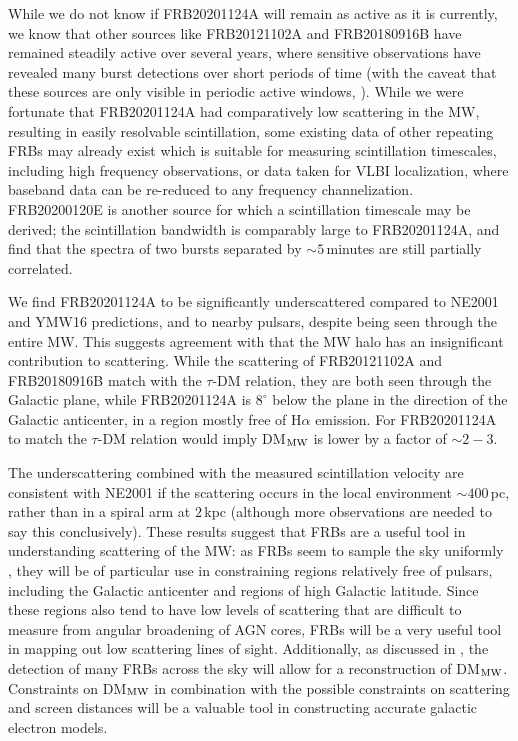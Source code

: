 \documentclass[fleqn,usenatbib]{mnras}
\newcommand{\frb}{FRB20201124A}
\newcommand{\rGC}{FRB20200120E}
\newcommand{\rthree}{FRB20180916B}
\newcommand{\rone}{FRB20121102A}
\begin{document}
While we do not know if {\frb} will remain as active as it is currently, we know that other sources like {\rone} and {\rthree} have remained steadily active over several years, where sensitive observations have revealed many burst detections over short periods of time (with the caveat that these sources are only visible in periodic active windows, \citealt{chime20_periodicity, rajwade+20}).  While we were fortunate that {\frb} had comparatively low scattering in the MW, resulting in easily resolvable scintillation, some existing data of other repeating FRBs may already exist which is suitable for measuring scintillation timescales, including high frequency observations, or data taken for VLBI localization, where baseband data can be re-reduced to any frequency channelization.  {\rGC} is another source for which a scintillation timescale may be derived; the scintillation bandwidth is comparably large to {\frb}, and \citet{nimmo+21b} find that the spectra of two bursts separated by $\sim 5$\,minutes are still partially correlated.

We find {\frb} to be significantly underscattered compared to NE2001 and YMW16 predictions, 
and to nearby pulsars, despite being seen through the entire MW.  This suggests 
agreement with \citet{ocker+21} that the MW halo has an insignificant contribution 
to scattering.  While the scattering of {\rone} and {\rthree} match with the $\tau$-DM 
relation, they are both seen through the Galactic plane, while {\frb} is $8^{\circ}$ 
below the plane in the direction of the Galactic anticenter, in a region mostly free of H$\alpha$ 
emission.  For \frb{} to match the $\tau$-DM relation would imply DM$_{\rm MW}$ is lower by a factor of $\sim 2-3$.

The underscattering combined with the measured scintillation velocity are consistent with NE2001 if the scattering occurs in the local environment $\sim 400\,$pc, rather than in a spiral arm at $2\,$kpc (although more observations are needed to say this conclusively).  
These results suggest that FRBs are a useful tool in understanding scattering of 
the MW: as FRBs seem to sample the sky uniformly \citep{chime2021_gallat}, they will 
be of particular use in constraining regions relatively free of pulsars, including the 
Galactic anticenter and regions of high Galactic latitude.  Since these regions 
also tend to have low levels of scattering that are difficult to measure from angular 
broadening of AGN cores, FRBs will be a very useful tool in mapping out low scattering 
lines of sight.  Additionally, as discussed in \citet{walker+20}, the detection of many FRBs across the sky will allow for a reconstruction of DM$_{\rm MW}$.  Constraints on DM$_{\rm MW}$ in combination with the possible constraints on scattering and screen distances will be a valuable tool in constructing accurate galactic electron models.
\end{document}

